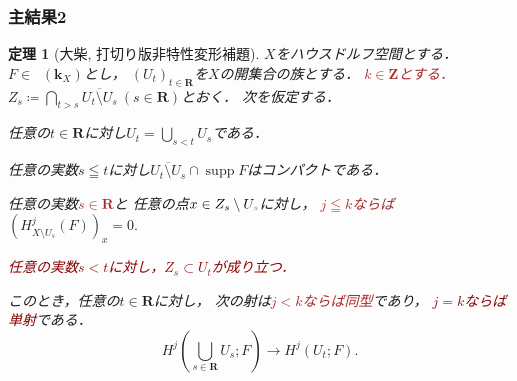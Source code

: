 \documentclass[dvipdfmx,10pt,aspectratio=169,leqno]{beamer}%
\newcommand{\zz}{\mathbf{Z}}
\newcommand{\rr}{\mathbf{R}}
\newcommand{\kk}{\mathbf{k}}
\numberwithin{equation}{subsection}
\newcommand{\supp}{\mathop{\mathrm{supp}}\nolimits}
\newcommand{\Dompl}{\mathop{\mathsf{D}^\mathrm{+}}\nolimits}
\theoremstyle{mystyle}
\newtheorem{THM}[AXM]{定理}
\begin{document}
\begin{frame}
    \frametitle{主結果2}
  \begin{THM}[大柴, 打切り版非特性変形補題]
    \(X\)をハウスドルフ空間とする．
    \(F\in\Dompl(\kk_X)\)とし，
    \(\left(U_{t}\right)_{t\in\rr}\)を\(X\)の開集合の族とする．
    \textcolor{brown}{\(k\in\zz\)とする．}
    \(
      Z_{s}\coloneqq \bigcap_{t>s}\overline{U_t\setminus U_s}\ (s\in\rr)
    \)とおく．
    次を仮定する．%
    \begin{enumerate}[(i)]
      \setlength{\leftskip}{10pt}
      \item \label{item:t-nonchar1}
      任意の\(t\in\rr\)に対し\(U_{t}=\bigcup_{s<t}U_{s}\)である．
      \item \label{item:t-nonchar2}
      任意の実数\(s\leqq t\)に対し\(
        \overline{U_{t}\setminus U_{s}}\cap \supp{F}
      \)はコンパクトである．
      \item \label{item:t-nonchar3}
      任意の実数\textcolor{brown}{\(s\in\rr\)}と
      任意の点\(x\in Z_{s}\setminus U_{\textcolor{brown}{s}}\)に対し，
      \textcolor{brown}{\(j\leqq k\)ならば}
      \(
        (H^{j}_{X\setminus U_{s}}(F))_{x}=0. 
      \)
      \textcolor{darkred}{\item \label{item:t-nonchar4} 
      任意の実数\(s< t\)に対し，\(Z_s\subset U_{t}\)が成り立つ．}
    \end{enumerate}
    このとき，任意の\(t\in\rr\)に対し，
    次の射は\textcolor{brown}{\(j<k\)ならば同型}であり，
    \textcolor{darkred}{\(j=k\)ならば単射}である．
    \[
      H^{j}\left(\bigcup_{s\in\rr}U_{s};F\right)
      \to
      H^{j}\left(U_{t};F\right).
    \]
  \end{THM}
\end{frame}
\end{document}
